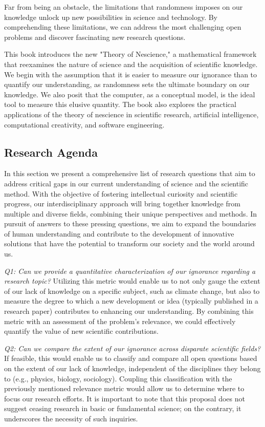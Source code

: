 Far from being an obstacle, the limitations that randomness imposes on our knowledge unlock up new possibilities in science and technology. By comprehending these limitations, we can address the most challenging open problems and discover fascinating new research questions.

This book introduces the new "Theory of Nescience," a mathematical framework that reexamines the nature of science and the acquisition of scientific knowledge. We begin with the assumption that it is easier to measure our ignorance than to quantify our understanding, as randomness sets the ultimate boundary on our knowledge. We also posit that the computer, as a conceptual model, is the ideal tool to measure this elusive quantity. The book also explores the practical applications of the theory of nescience in scientific research, artificial intelligence, computational creativity, and software engineering.

%
%

\subsection*{Research Agenda}

In this section we present a comprehensive list of research questions that aim to address critical gaps in our current understanding of science and the scientific method. With the objective of fostering intellectual curiosity and scientific progress, our interdisciplinary approach will bring together knowledge from multiple and diverse fields, combining their unique perspectives and methods. In pursuit of answers to these pressing questions, we aim to expand the boundaries of human understanding and contribute to the development of innovative solutions that have the potential to transform our society and the world around us.

\emph{Q1: Can we provide a quantitative characterization of our ignorance regarding a research topic?} Utilizing this metric would enable us to not only gauge the extent of our lack of knowledge on a specific subject, such as climate change, but also to measure the degree to which a new development or idea (typically published in a research paper) contributes to enhancing our understanding. By combining this metric with an assessment of the problem's relevance, we could effectively quantify the value of new scientific contributions.

\emph{Q2: Can we compare the extent of our ignorance across disparate scientific fields?} If feasible, this would enable us to classify and compare all open questions based on the extent of our lack of knowledge, independent of the disciplines they belong to (e.g., physics, biology, sociology). Coupling this classification with the previously mentioned relevance metric would allow us to determine where to focus our research efforts. It is important to note that this proposal does not suggest ceasing research in basic or fundamental science; on the contrary, it underscores the necessity of such inquiries.

